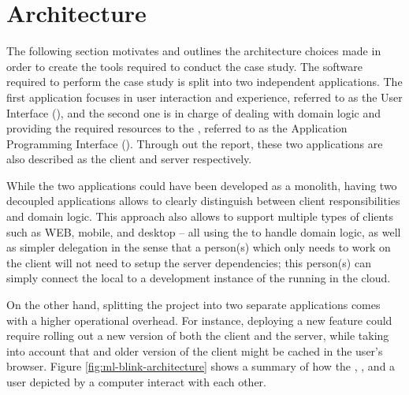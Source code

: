 \section{Architecture} \label{sect:case-study:arch}

The following section motivates and outlines the architecture choices made in order to create the tools required to conduct the case study. The software required to perform the case study is split into two independent applications. The first application focuses in user interaction and experience, referred to as the \mlblink User Interface (\mlblinkui), and the second one is in charge of dealing with domain logic and providing the required resources to the \mlblinkui, referred to as the \mlblink Application Programming Interface (\mlblinkapi). Through out the report, these two applications are also described as the client and server respectively.  \newline

While the two applications could have been developed as a monolith, having two decoupled applications allows to clearly distinguish between client responsibilities and domain logic. This approach also allows to support multiple types of clients such as WEB, mobile, and desktop -- all using the \mlblinkapi to handle domain logic, as well as simpler delegation in the sense that a person(s) which only needs to work on the client will not need to setup the server dependencies; this person(s) can simply connect the local \mlblinkui to a development instance of the \mlblinkapi running in the cloud. \newline

On the other hand, splitting the project into two separate applications comes with a higher operational overhead. For instance, deploying a new feature could require rolling out a new version of both the client and the server, while taking into account that and older version of the client might be cached in the user's browser. Figure \ref{fig:ml-blink-architecture} shows a summary of how the \mlblinkui, \mlblinkapi, and a user depicted by a computer interact with each other.

